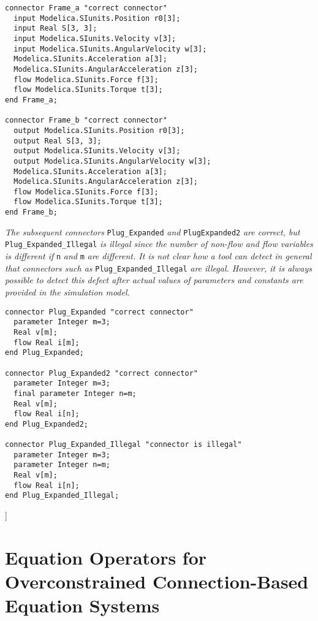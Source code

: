 \begin{lstlisting}[language=modelica]
connector Frame_a "correct connector"
  input Modelica.SIunits.Position r0[3];
  input Real S[3, 3];
  input Modelica.SIunits.Velocity v[3];
  input Modelica.SIunits.AngularVelocity w[3];
  Modelica.SIunits.Acceleration a[3];
  Modelica.SIunits.AngularAcceleration z[3];
  flow Modelica.SIunits.Force f[3];
  flow Modelica.SIunits.Torque t[3];
end Frame_a;

connector Frame_b "correct connector"
  output Modelica.SIunits.Position r0[3];
  output Real S[3, 3];
  output Modelica.SIunits.Velocity v[3];
  output Modelica.SIunits.AngularVelocity w[3];
  Modelica.SIunits.Acceleration a[3];
  Modelica.SIunits.AngularAcceleration z[3];
  flow Modelica.SIunits.Force f[3];
  flow Modelica.SIunits.Torque t[3];
end Frame_b;
\end{lstlisting}

\emph{The subsequent connectors} \lstinline!Plug_Expanded! \emph{and} \lstinline!PlugExpanded2!
\emph{are correct, but} \lstinline!Plug_Expanded_Illegal! \emph{is illegal since
the number of non-flow and flow variables is different if} \lstinline!n! \emph{and} \lstinline!m! \emph{are different. It is not clear how a tool can detect in
general that connectors such as} \lstinline!Plug_Expanded_Illegal! \emph{are
illegal. However, it is always possible to detect this defect after
actual values of parameters and constants are provided in the simulation
model.}

\begin{lstlisting}[language=modelica]
connector Plug_Expanded "correct connector"
  parameter Integer m=3;
  Real v[m];
  flow Real i[m];
end Plug_Expanded;

connector Plug_Expanded2 "correct connector"
  parameter Integer m=3;
  final parameter Integer n=m;
  Real v[m];
  flow Real i[n];
end Plug_Expanded2;

connector Plug_Expanded_Illegal "connector is illegal"
  parameter Integer m=3;
  parameter Integer n=m;
  Real v[m];
  flow Real i[n];
end Plug_Expanded_Illegal;
\end{lstlisting}

{]}

\section{Equation Operators for Overconstrained Connection-Based Equation Systems}

